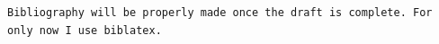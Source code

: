 \documentclass[11pt]{article}
\numberwithin{equation}{section}
\numberwithin{table}{section}
\numberwithin{figure}{section}
\newcommand{\comment}[1]{\texttt{\color{red}#1}}
\begin{document}
\comment{Bibliography will be properly made once the draft is complete. For only now I use biblatex.}
%
\end{document}
